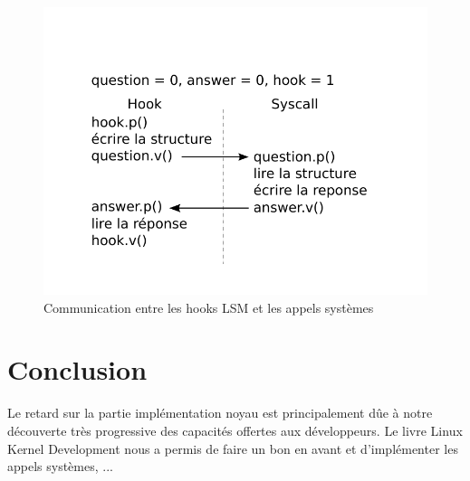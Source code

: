 \documentclass[pdftex,a4paper,titlepage,11pt,openright]{article}
\newcommand{\clearemptydoublepage}{
	\newpage{\pagestyle{empty}\cleardoublepage}}
\begin{document}
\begin{figure}[hb]
	\centering
	\includegraphics[scale=1]{syscall_sync.pdf}
	\caption{Communication entre les hooks LSM et les appels systèmes}
\end{figure}

\newpage

\clearemptydoublepage

\section*{Conclusion} 

Le retard sur la partie implémentation noyau est principalement dûe à notre découverte très progressive des capacités offertes aux développeurs. Le livre Linux Kernel Development \cite{LKDSE} nous a permis de faire un bon en avant et d'implémenter les appels systèmes, ...

\end{document}
